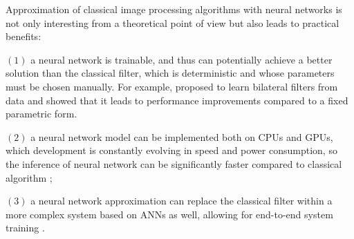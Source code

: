 
Approximation of classical image processing algorithms with neural networks is not only interesting from a theoretical point of view but also leads to practical benefits:






$(1)$ a neural network is trainable, and thus can potentially achieve a better solution than the classical filter, which is deterministic and whose parameters must be chosen manually. For example, \cite{Jampani2016LearningSH} proposed to learn bilateral filters from data and showed that it leads to performance improvements compared to a fixed parametric form. 

$(2)$ a neural network model can be implemented both on CPUs and GPUs, which development is constantly evolving in speed and power consumption, so the inference of neural network can be significantly faster compared to classical algorithm \citep{Febbo2018KCNN};

$(3)$ a neural network approximation can replace the classical filter within a more complex system based on ANNs as well, allowing for end-to-end system training \citep{Yi2016LearnedIFT}.

